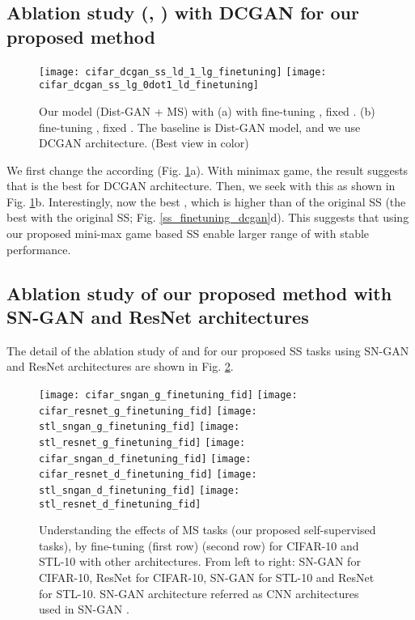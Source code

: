\documentclass{article}
\begin{document}
\subsection{Ablation study (, ) with DCGAN for our proposed method}
\label{ablation_study_minimax_dcgan}

\begin{figure}
  \centering
  \texttt{[image: cifar\_dcgan\_ss\_ld\_1\_lg\_finetuning]}
  \texttt{[image: cifar\_dcgan\_ss\_lg\_0dot1\_ld\_finetuning]}
  \caption{Our model (Dist-GAN + MS) with (a) with fine-tuning , fixed . (b) fine-tuning , fixed . The baseline is Dist-GAN model, and we use DCGAN architecture. (Best view in color)}
  \label{cifar_dcgan_finetuning_g_d}
\end{figure}

We first change the  according  (Fig. \ref{cifar_dcgan_finetuning_g_d}a). With minimax game, the result suggests that  is the best for DCGAN architecture. Then, we seek  with this  as shown in Fig. \ref{cifar_dcgan_finetuning_g_d}b. Interestingly, now the best , which is higher than  of the original SS (the best with the original SS; Fig. \ref{ss_finetuning_dcgan}d). This suggests that using our proposed mini-max game based SS enable larger range of  with stable performance. 



\subsection{Ablation study of our proposed method with SN-GAN and ResNet architectures}
\label{appendix_state_of_the_art}

The detail of the ablation study of  and  for our proposed SS tasks using SN-GAN and ResNet architectures are shown in Fig. \ref{appendix_ss_d_g_finetuning_all}.


\begin{figure}
  \centering
\texttt{[image: cifar\_sngan\_g\_finetuning\_fid]}
  \texttt{[image: cifar\_resnet\_g\_finetuning\_fid]}
  \texttt{[image: stl\_sngan\_g\_finetuning\_fid]}
  \texttt{[image: stl\_resnet\_g\_finetuning\_fid]}  
  \texttt{[image: cifar\_sngan\_d\_finetuning\_fid]}
  \texttt{[image: cifar\_resnet\_d\_finetuning\_fid]}
  \texttt{[image: stl\_sngan\_d\_finetuning\_fid]}
  \texttt{[image: stl\_resnet\_d\_finetuning\_fid]}
\caption{Understanding the effects of MS tasks (our proposed self-supervised tasks), by  fine-tuning  (first row)  (second row) for CIFAR-10 and STL-10 with other architectures. From left to right: SN-GAN for CIFAR-10, ResNet for CIFAR-10, SN-GAN for STL-10 and ResNet for STL-10. SN-GAN architecture referred as CNN architectures used in SN-GAN \cite{miyato-iclr-2018}.}
  \label{appendix_ss_d_g_finetuning_all} 
\end{figure}
\end{document}
